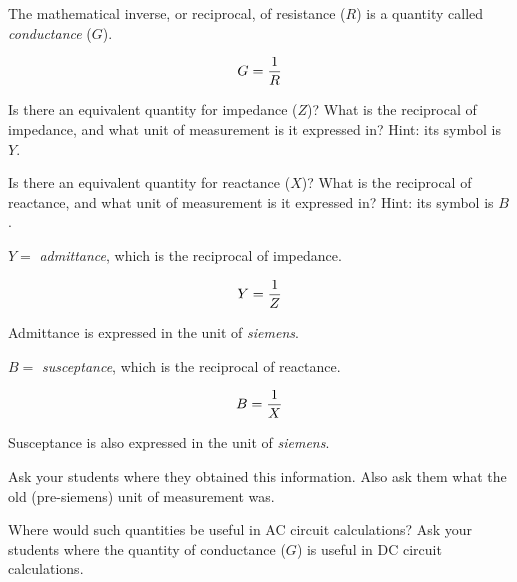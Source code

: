 

The mathematical inverse, or reciprocal, of resistance ($R$) is a quantity called {\it conductance} ($G$).

$$G = {1 \over R}$$

Is there an equivalent quantity for impedance ($Z$)?  What is the reciprocal of impedance, and what unit of measurement is it expressed in?  Hint: its symbol is $Y$.

\vskip 10pt

Is there an equivalent quantity for reactance ($X$)?  What is the reciprocal of reactance, and what unit of measurement is it expressed in?  Hint: its symbol is $B$.







$Y =$ {\it admittance}, which is the reciprocal of impedance.

$$Y = {1 \over Z}$$

Admittance is expressed in the unit of {\it siemens}.

\vskip 10pt

$B =$ {\it susceptance}, which is the reciprocal of reactance.

$$B = {1 \over X}$$

Susceptance is also expressed in the unit of {\it siemens}.







Ask your students where they obtained this information.  Also ask them what the old (pre-siemens) unit of measurement was.

Where would such quantities be useful in AC circuit calculations?  Ask your students where the quantity of conductance ($G$) is useful in DC circuit calculations.




